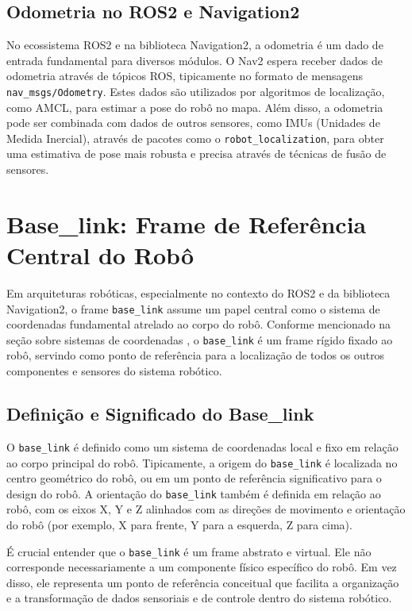 \subsection{Odometria no ROS2 e Navigation2}

No ecossistema ROS2 e na biblioteca Navigation2, a odometria é um dado de
entrada fundamental para diversos módulos. O Nav2 espera receber dados de
odometria através de tópicos ROS, tipicamente no formato de mensagens
\texttt{nav\_msgs/Odometry}. Estes dados são utilizados por algoritmos de
localização, como AMCL, para estimar a pose do robô no mapa. Além disso, a
odometria pode ser combinada com dados de outros sensores, como IMUs (Unidades
de Medida Inercial), através de pacotes como o \texttt{robot\_localization},
para obter uma estimativa de pose mais robusta e precisa através de técnicas de
fusão de sensores.

\section{Base\_link: Frame de Referência Central do Robô}

Em arquiteturas robóticas, especialmente no contexto do ROS2 e da biblioteca
Navigation2, o frame \texttt{base\_link} assume um papel central como o sistema
de coordenadas fundamental atrelado ao corpo do robô. Conforme mencionado na
seção sobre sistemas de coordenadas \cite{Babu2020Simulator}, o
\texttt{base\_link} é um frame rígido fixado ao robô, servindo como ponto de
referência para a localização de todos os outros componentes e sensores do
sistema robótico.

\subsection{Definição e Significado do Base\_link}

O \texttt{base\_link} é definido como um sistema de coordenadas local e fixo em
relação ao corpo principal do robô. Tipicamente, a origem do
\texttt{base\_link} é localizada no centro geométrico do robô, ou em um ponto
de referência significativo para o design do robô. A orientação do
\texttt{base\_link} também é definida em relação ao robô, com os eixos X, Y e Z
alinhados com as direções de movimento e orientação do robô (por exemplo, X
para frente, Y para a esquerda, Z para cima).

É crucial entender que o \texttt{base\_link} é um frame abstrato e virtual. Ele não corresponde necessariamente a um componente físico específico do robô. Em vez disso, ele representa um ponto de referência conceitual que facilita a organização e a transformação de dados sensoriais e de controle dentro do sistema robótico.

